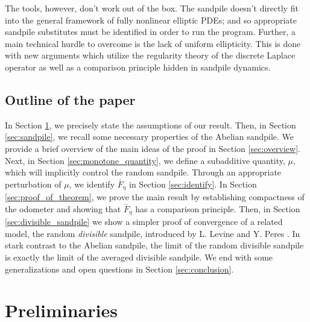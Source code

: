\documentclass[12pt]{amsart}
\begin{document}
	The tools, however, don't work out of the box. The sandpile doesn't directly fit into the general framework of fully nonlinear elliptic PDEs; and so appropriate sandpile substitutes must be identified in order to run the program. 
Further, a main technical hurdle to overcome is the lack of uniform ellipticity. This is done with new arguments which utilize the regularity theory of the discrete Laplace operator
as well as a comparison principle hidden in sandpile dynamics. 
	

	
\subsection{Outline of the paper}
In Section \ref{prelims}, we precisely state the assumptions of our result. Then, in Section \ref{sec:sandpile}, we recall some necessary properties of the Abelian sandpile. We provide a brief overview of the main ideas of the proof 
in Section \ref{sec:overview}. Next, in Section \ref{sec:monotone_quantity}, we define a subadditive quantity, $\mu$, which will implicitly control the random sandpile. Through an appropriate perturbation of $\mu$, we identify $\bar{F}_\eta$ in Section \ref{sec:identify}. 
In Section \ref{sec:proof_of_theorem}, we prove the main result by establishing compactness of the odometer 
and showing that $\bar{F}_{\eta}$ has a comparison principle.  Then, in Section \ref{sec:divisible_sandpile} we show a simpler proof of convergence of a related model, the random {\it divisible} sandpile, introduced by L. Levine and Y. Peres  \cite{levine2009strong,levine2010scaling}. In stark contrast to the Abelian sandpile, the limit of the random divisible sandpile is exactly the limit of the averaged divisible sandpile. We end with some generalizations and open questions in Section \ref{sec:conclusion}.



\section{Preliminaries} \label{prelims}
\end{document}
